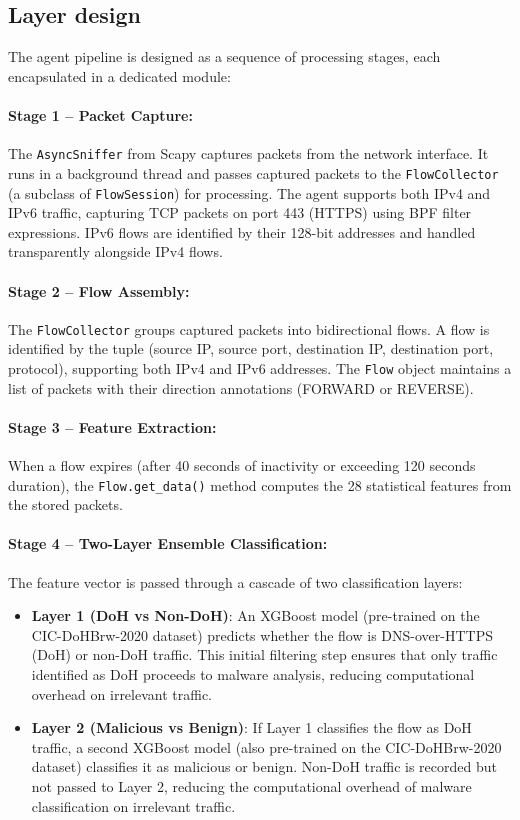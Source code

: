 \documentclass[../Main.tex]{subfiles}
\begin{document}
\subsection{Layer design}
\label{section:4.2.2}

The agent pipeline is designed as a sequence of processing stages, each encapsulated in a dedicated module:

\paragraph{Stage 1 -- Packet Capture:} The \texttt{AsyncSniffer} from Scapy captures packets from the network interface. It runs in a background thread and passes captured packets to the \texttt{FlowCollector} (a subclass of \texttt{FlowSession}) for processing. The agent supports both IPv4 and IPv6 traffic, capturing TCP packets on port 443 (HTTPS) using BPF filter expressions. IPv6 flows are identified by their 128-bit addresses and handled transparently alongside IPv4 flows.

\paragraph{Stage 2 -- Flow Assembly:} The \texttt{FlowCollector} groups captured packets into bidirectional flows. A flow is identified by the tuple (source IP, source port, destination IP, destination port, protocol), supporting both IPv4 and IPv6 addresses. The \texttt{Flow} object maintains a list of packets with their direction annotations (FORWARD or REVERSE).

\paragraph{Stage 3 -- Feature Extraction:} When a flow expires (after 40 seconds of inactivity or exceeding 120 seconds duration), the \texttt{Flow.get\_data()} method computes the 28 statistical features from the stored packets.

\paragraph{Stage 4 -- Two-Layer Ensemble Classification:} The feature vector is passed through a cascade of two classification layers:

\begin{itemize}
    \item \textbf{Layer 1 (DoH vs Non-DoH)}: An XGBoost model (pre-trained on the CIC-DoHBrw-2020 dataset) predicts whether the flow is DNS-over-HTTPS (DoH) or non-DoH traffic. This initial filtering step ensures that only traffic identified as DoH proceeds to malware analysis, reducing computational overhead on irrelevant traffic.
    \item \textbf{Layer 2 (Malicious vs Benign)}: If Layer 1 classifies the flow as DoH traffic, a second XGBoost model (also pre-trained on the CIC-DoHBrw-2020 dataset) classifies it as malicious or benign. Non-DoH traffic is recorded but not passed to Layer 2, reducing the computational overhead of malware classification on irrelevant traffic.
\end{itemize}
\end{document}
